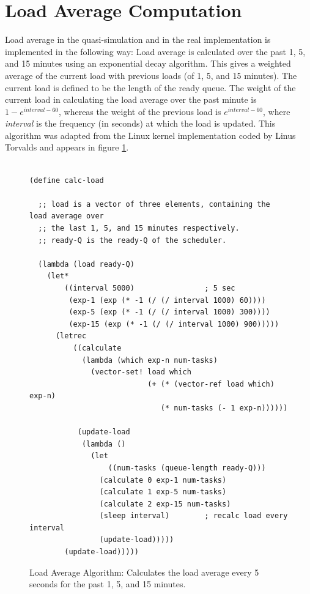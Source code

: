 \documentclass{report}
\begin{document}
\section{Load Average Computation}

Load average in the quasi-simulation and in the real implementation is
implemented in the following way: Load average is calculated over the past
1, 5, and 15 minutes using an exponential decay algorithm.  This gives a
weighted average of the current load with previous loads (of 1, 5, and 15
minutes).  The current load is defined to be the length of the ready queue.
The weight of the current load in calculating the load average over the past
minute is $1 - e^{interval - 60}$, whereas the weight of the previous load
is $e^{interval - 60}$, where \emph{interval} is the frequency (in seconds)
at which the load is updated.  This algorithm was adapted from the Linux
kernel implementation coded by Linus Torvalds and appears in figure
\ref{fig:load_avg_alg}. 

\begin{figure}
\label{fig:load_avg_alg}
\caption{Load Average Algorithm: Calculates the load average every 5 seconds
for the past 1, 5, and 15 minutes.}

\begin{verbatim}

(define calc-load

  ;; load is a vector of three elements, containing the load average over
  ;; the last 1, 5, and 15 minutes respectively.
  ;; ready-Q is the ready-Q of the scheduler.

  (lambda (load ready-Q)
    (let*
        ((interval 5000)                ; 5 sec
         (exp-1 (exp (* -1 (/ (/ interval 1000) 60))))
         (exp-5 (exp (* -1 (/ (/ interval 1000) 300))))
         (exp-15 (exp (* -1 (/ (/ interval 1000) 900)))))
      (letrec 
          ((calculate
            (lambda (which exp-n num-tasks)
              (vector-set! load which
                           (+ (* (vector-ref load which) exp-n)
                              (* num-tasks (- 1 exp-n))))))
           
           (update-load
            (lambda ()
              (let
                  ((num-tasks (queue-length ready-Q)))
                (calculate 0 exp-1 num-tasks)
                (calculate 1 exp-5 num-tasks)
                (calculate 2 exp-15 num-tasks)
                (sleep interval)        ; recalc load every interval
                (update-load)))))
        (update-load)))))

\end{verbatim}

\end{figure}
\end{document}
